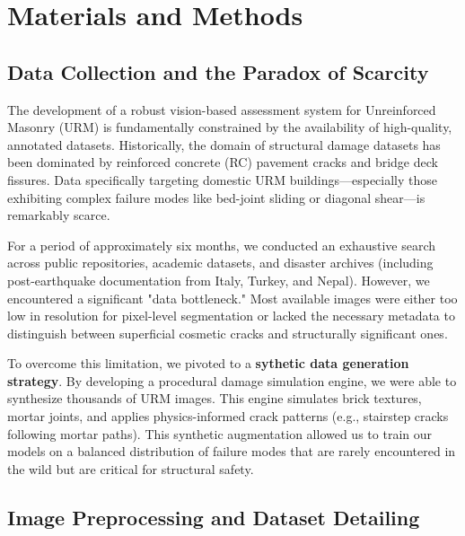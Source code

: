 \section{Materials and Methods}
\label{sec:materials_methods}

\subsection{Data Collection and the Paradox of Scarcity}
\label{subsec:data_collection}

\begin{sloppypar}
The development of a robust vision-based assessment system for Unreinforced Masonry (URM) is fundamentally constrained by the availability of high-quality, annotated datasets. Historically, the domain of structural damage datasets has been dominated by reinforced concrete (RC) pavement cracks and bridge deck fissures. Data specifically targeting domestic URM buildings—especially those exhibiting complex failure modes like bed-joint sliding or diagonal shear—is remarkably scarce.
\end{sloppypar}

\begin{sloppypar}
For a period of approximately six months, we conducted an exhaustive search across public repositories, academic datasets, and disaster archives (including post-earthquake documentation from Italy, Turkey, and Nepal). However, we encountered a significant "data bottleneck." Most available images were either too low in resolution for pixel-level segmentation or lacked the necessary metadata to distinguish between superficial cosmetic cracks and structurally significant ones.
\end{sloppypar}

\begin{sloppypar}
To overcome this limitation, we pivoted to a \textbf{sythetic data generation strategy}. By developing a procedural damage simulation engine, we were able to synthesize thousands of URM images. This engine simulates brick textures, mortar joints, and applies physics-informed crack patterns (e.g., stairstep cracks following mortar paths). This synthetic augmentation allowed us to train our models on a balanced distribution of failure modes that are rarely encountered in the wild but are critical for structural safety.
\end{sloppypar}

\subsection{Image Preprocessing and Dataset Detailing}
\label{subsec:preprocessing}

